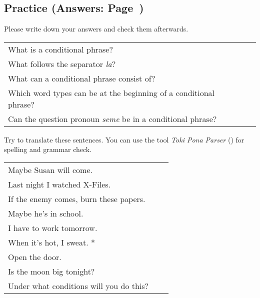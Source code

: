 %
%
%
\newpage
%
\subsection*{Practice (Answers: Page~\pageref{'la'})}
%
Please write down your answers and check them afterwards. 

\begin{supertabular}{p{5,5cm}|ll}
What is a conditional phrase? &&  \\  %
What follows the separator \textit{la}? &&  \\  %
What can a conditional phrase consist of?  &&  \\  %
Which word types can be at the beginning of a conditional phrase? &&  \\  %
Can the question pronoun \textit{seme} be in a conditional phrase? &&   \\  %
\end{supertabular}

Try to translate these sentences. 
You can use the tool \textit{Toki Pona Parser} (\cite{www:rowa:02}) for spelling and grammar check. 

\begin{supertabular}{p{5,5cm}|ll}
Maybe Susan will come.  && \\ %
Last night I watched X-Files.  &&   \\ %
If the enemy comes, burn these papers.  &&   \\ %
Maybe he's in school.  &&   \\ %
I have to work tomorrow.  &&   \\ %
When it's hot, I sweat. *  &&  \\ %
Open the door.   &&  \\ %
Is the moon big tonight?  &&  \\ %
Under what conditions will you do this? &&  \\ %
\end{supertabular}

